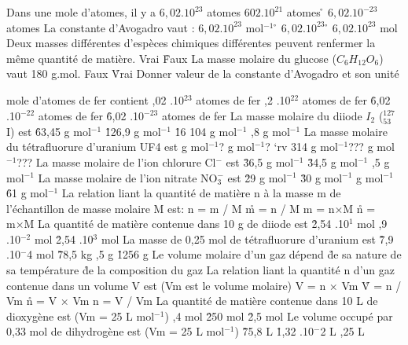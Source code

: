           \q
Dans une mole d'atomes, il y a 
\rv
$6,02.10^{23}$ atomes
\rv
$602.10^{21}$ atomes
\r
$6,02.10^{-23}$ atomes
\q
La constante d'Avogadro vaut :
\rv
$6,02.10^{23}$ mol$^{-1}$
\r 
$6,02.10^{23}$
\r
$6,02.10^{23}$ mol
\q 
Deux masses différentes d'espèces chimiques différentes peuvent renfermer la même quantité de matière.
\rv
Vrai
\r
Faux
\q
La masse molaire du glucose ($C_6H_{12}O_6$) vaut
180 g.mol.
\rv
Faux
\r
Vrai
\q
Donner valeur de la constante d'Avogadro et son unité

 mole d'atomes de fer contient 
,02 .10$^{23}$ atomes de fer
,2 .10$^{22}$ atomes de fer
\r
       6,02 .10$^{-22}$ atomes de fer
\r
       6,02 .10$^{-23}$ atomes de fer
\q
La masse molaire du diiode $I_2$ ($_{53}^{127}$I) est
\r
       63,45 g mol$^{-1}$
\r
       126,9 g mol$^{-1}$
\r
       16 104 g mol$^{-1}$
,8 g mol$^{-1}$
\q
La masse molaire du tétrafluorure d'uranium UF4 est 
 g mol$^{-1}$?
 g mol$^{-1}$?
`rv
       314 g mol$^{-1}$???
 g mol$^{-1}$???
\q
La masse molaire de l'ion chlorure Cl$^{-}$ est 
\r
       36,5 g mol$^{-1}$
\r
       34,5 g mol$^{-1}$
,5 g mol$^{-1}$
\q
La masse molaire de l'ion nitrate NO$_3^-$ est 
\r
       29 g mol$^{-1}$
\r
       30 g mol$^{-1}$
 g mol$^{-1}$
\r
       61 g mol$^{-1}$
\q
La relation liant la quantité de matière n à la masse m de l'échantillon de masse molaire M est: 
\rv
       n = m / M
\r
       m = n / M
\rv
       m = n×M
\r
       n = m×M
\q
La quantité de matière contenue dans 10 g de diiode est
\r
       2,54 .10$^{1}$ mol
,9 .10$^{-2}$ mol
\r
       2,54 .10$^{3}$ mol
\q
La masse de 0,25 mol de tétrafluorure d'uranium est 
\r
       7,9 .10$^{-}$4 mol
\r
       78,5 kg
,5 g
\r
       1256 g
\q
Le volume molaire d'un gaz dépend 
\r
       de sa nature
\rv
       de sa température
\r
       de la composition du gaz
\q
La relation liant la quantité n d'un gaz contenue dans un volume V est 
(Vm est le volume molaire)
\rv
       V = n × Vm
\r
       V = n / Vm
\r
       n = V × Vm
\rv
       n = V / Vm
\q
La quantité de matière contenue dans 10 L de dioxygène est 
(Vm = 25 L mol$^{-1}$)
,4 mol
\r
       250 mol
\r
       2,5 mol
\q
Le volume occupé par 0,33 mol de dihydrogène est 
(Vm = 25 L mol$^{-1}$)
\r
       75,8 L
\r
       1,32 .10$^{-}$2 L
,25 L